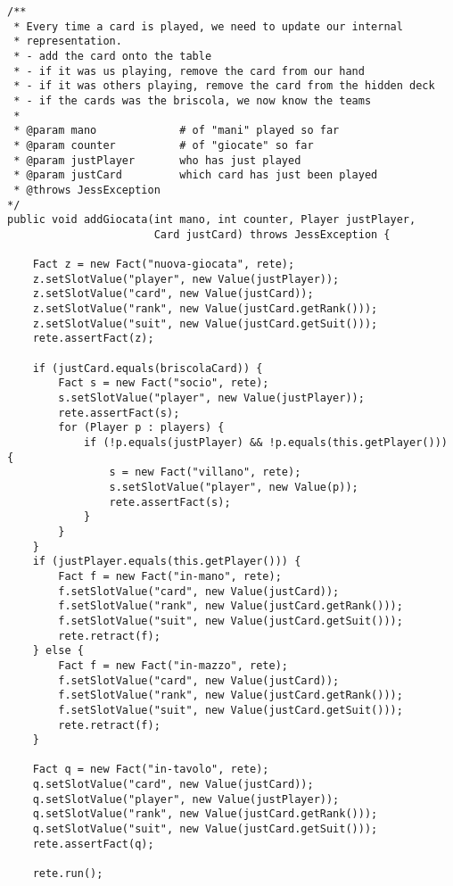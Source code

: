 \lstset{numbers=left, numberstyle=\tiny, stepnumber=1,firstnumber=1,
  numbersep=5pt,language=Java,
stringstyle=\ttfamily,
basicstyle=\footnotesize, 
showstringspaces=false,
breaklines=true
}

\begin{lstlisting}[caption={Funzione che viene richiamata ogni volta che si riceve la comunicazione di una nuova giocata (quindi anche la propria). Vengono aggiornati i fatti riguardanti la giocata stessa, la situazione in tavola e nel mazzo (ovvero nelle mani altrui) ed eventualmente i ruoli}, label=addGiocata]
/**
 * Every time a card is played, we need to update our internal
 * representation.
 * - add the card onto the table
 * - if it was us playing, remove the card from our hand
 * - if it was others playing, remove the card from the hidden deck
 * - if the cards was the briscola, we now know the teams
 *
 * @param mano             # of "mani" played so far
 * @param counter          # of "giocate" so far
 * @param justPlayer       who has just played
 * @param justCard         which card has just been played
 * @throws JessException   
*/
public void addGiocata(int mano, int counter, Player justPlayer,
                       Card justCard) throws JessException {

    Fact z = new Fact("nuova-giocata", rete);
    z.setSlotValue("player", new Value(justPlayer));
    z.setSlotValue("card", new Value(justCard));
    z.setSlotValue("rank", new Value(justCard.getRank()));
    z.setSlotValue("suit", new Value(justCard.getSuit()));
    rete.assertFact(z);

    if (justCard.equals(briscolaCard)) {
        Fact s = new Fact("socio", rete);
        s.setSlotValue("player", new Value(justPlayer));
        rete.assertFact(s);
        for (Player p : players) {
            if (!p.equals(justPlayer) && !p.equals(this.getPlayer())) {
                s = new Fact("villano", rete);
                s.setSlotValue("player", new Value(p));
                rete.assertFact(s);
            }
        }
    }
    if (justPlayer.equals(this.getPlayer())) {
        Fact f = new Fact("in-mano", rete);
        f.setSlotValue("card", new Value(justCard));
        f.setSlotValue("rank", new Value(justCard.getRank()));
        f.setSlotValue("suit", new Value(justCard.getSuit()));
        rete.retract(f);
    } else {
        Fact f = new Fact("in-mazzo", rete);
        f.setSlotValue("card", new Value(justCard));
        f.setSlotValue("rank", new Value(justCard.getRank()));
        f.setSlotValue("suit", new Value(justCard.getSuit()));
        rete.retract(f);
    }

    Fact q = new Fact("in-tavolo", rete);
    q.setSlotValue("card", new Value(justCard));
    q.setSlotValue("player", new Value(justPlayer));
    q.setSlotValue("rank", new Value(justCard.getRank()));
    q.setSlotValue("suit", new Value(justCard.getSuit()));
    rete.assertFact(q);
    
    rete.run();
\end{lstlisting}
